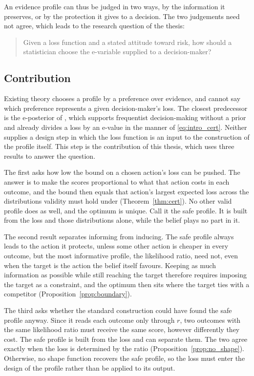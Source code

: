 An evidence profile can thus be judged in two ways, by the information it preserves, or
by the protection it gives to a decision. The two judgements need not agree, which leads to
the research question of the thesis:
\begin{quote}
Given a loss function and a stated attitude toward risk, how should a
statistician choose the e-variable supplied to a decision-maker?
\end{quote}

\subsection{Contribution}\label{sec:intro_contrib}

Existing theory chooses a profile by a preference over evidence, and cannot
say which preference represents a given decision-maker's loss. The closest predecessor is
the e-posterior of \citet{Grunwald2023epost}, which supports frequentist
decision-making without a prior and already divides a loss by an e-value in
the manner of \eqref{eq:intro_cert}. Neither supplies a design step in which the loss
function is an input to the construction of the profile itself. This step is the contribution of
this thesis, which uses three results to answer the question.

The first asks how low the bound on a chosen action's loss can be pushed. The
answer is to make the scores proportional to what that action costs in each
outcome, and the bound then equals that action's largest expected loss across
the distributions validity must hold under (Theorem~\ref{thm:cert}). No other
valid profile does as well, and the optimum is unique. Call it the safe
profile. It is built from the loss and those distributions alone, while the
belief plays no part in it.

The second result separates informing from inducing. The safe profile
always leads to the action it protects, unless some other action is cheaper in
every outcome, but the most informative profile, the likelihood ratio, need
not, even when the target is the action the belief
itself favours. Keeping as much information as possible while still reaching
the target therefore requires imposing the target as a constraint, and the
optimum then sits where the target ties with a competitor
(Proposition~\ref{prop:boundary}).

The third asks whether the standard construction could have found the
safe profile anyway. Since it reads each outcome only through $r$, two
outcomes with the same likelihood ratio must receive the same score, however
differently they cost. The safe profile is built from the loss
and can separate them. The two agree exactly when the loss is determined by
the ratio (Proposition~\ref{prop:no_shape}). Otherwise, no shape function
recovers the safe profile, so the loss must enter the design of the
profile rather than be applied to its output.
